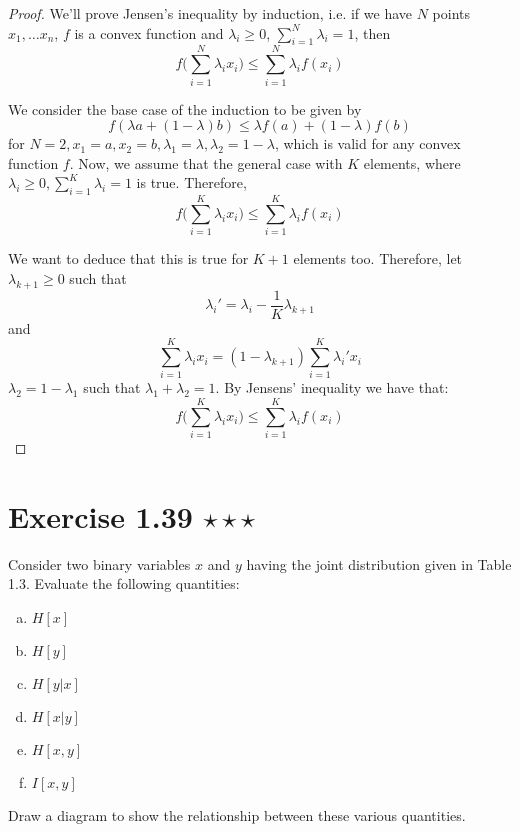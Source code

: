 \begin{proof}
    We'll prove Jensen's inequality by induction, i.e.
    if we have $N$ points $x_1, \ldots x_n$, $f$ is a convex function and $\lambda_i \geq 0$, 
    $\displaystyle \sum_{i=1}^{N} \lambda_i = 1$, then
    \begin{equation}\label{eq:1.115}\tag{1.115}
        f\bigg(\sum_{i=1}^{N} \lambda_i x_i\bigg) \leq \sum_{i=1}^{N} \lambda_i f(x_i)
    \end{equation}

    We consider the base case of the induction to be given by
    \begin{equation}\label{eq:1.114}\tag{1.114}
        f(\lambda a + (1 - \lambda)b) \leq \lambda f(a) + (1 - \lambda) f(b)
    \end{equation}
    for $N = 2, x_1 = a, x_2 = b, \lambda_1 = \lambda, \lambda_2 = 1 - \lambda$, 
    which is valid for any convex function $f$. Now,
    we assume that the general case with $K$ elements,
    where $\lambda_i \geq 0, \displaystyle \sum_{i = 1}^K{\lambda_i} = 1$ 
    is true. Therefore, 
    \[
        f\bigg(\sum_{i=1}^{K} \lambda_i x_i\bigg) \leq \sum_{i=1}^{K} \lambda_i f(x_i)
    \] 

    We want to deduce that this is true for $K + 1$ elements too.
    Therefore, let $\lambda_{k + 1} \geq 0$ such that
    \[
        \lambda_i' = \lambda_i - \frac{1}{K} \lambda_{k + 1}
    \] 
    and 
    \[
        \sum_{i = 1}^{K} \lambda_i x_i = (1 - \lambda_{k + 1}) \sum_{i=1}^{K} \lambda_i' x_i
    \] 
    $\lambda_2 = 1 - \lambda_1$ such that $\lambda_1 + \lambda_2 = 1$.
    By Jensens' inequality we have that:
    \[
        f\bigg(\sum_{i=1}^{K} \lambda_i x_i\bigg) \leq \sum_{i=1}^{K} \lambda_i f(x_i)
    \] 
\end{proof}

\section*{Exercise 1.39 $\star \star \star$}
Consider two binary variables $x$ and $y$ having the joint distribution
given in Table 1.3. Evaluate the following quantities:
\begin{multicols}{3}
    \begin{enumerate}[(a)]
        \item $H[x]$
        \item $H[y]$
        \item $H[y | x]$
        \item $H[x | y]$
        \item $H[x, y]$
        \item $I[x, y]$
    \end{enumerate}
\end{multicols}
Draw a diagram to show the relationship between these various quantities.

